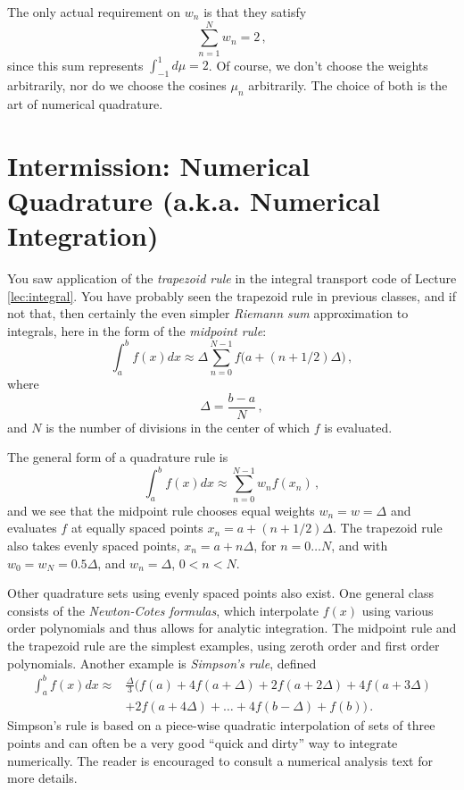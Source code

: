 The only actual requirement on $w_n$ is that they satisfy
\begin{equation}
 \sum^N_{n=1} w_n = 2 \, ,
\end{equation}
since this sum represents $\int^1_{-1} d\mu = 2$.  Of course, we don't choose the weights arbitrarily, nor do we choose the cosines $\mu_n$ arbitrarily.  The choice of both is the art of numerical quadrature.

\section*{Intermission: Numerical Quadrature (a.k.a. Numerical Integration)}

You saw application of the \textit{trapezoid rule} in the integral transport code of Lecture \ref{lec:integral}.  You have probably seen the trapezoid rule in previous classes, and if not that, then certainly the even simpler \textit{Riemann sum} approximation to integrals, here in the form of the \textit{midpoint rule}:
\begin{equation}
 \int^b_a f(x)dx \approx  \Delta \sum^{N-1}_{n=0} f \Big ( a + (n+1/2)\Delta \Big ) \, ,
\end{equation}
where
\begin{equation}
 \Delta = \frac{b-a}{N} \, ,
\end{equation}
and $N$ is the number of divisions in the center of which $f$ is evaluated.

The general form of a quadrature rule is
\begin{equation}
 \int^b_a f(x) dx \approx  \sum^{N-1}_{n=0} w_n f(x_n) \, , 
\end{equation}
and we see that the midpoint rule chooses equal weights $w_n = w = \Delta$ and evaluates $f$ at equally spaced points $x_n = a+(n+1/2)\Delta$.  The trapezoid rule also takes evenly spaced points, $x_n = a + n\Delta$, for $n = 0 \ldots N$, and with $w_0 = w_N = 0.5\Delta$, and $w_n = \Delta$, $0 < n < N$.

Other quadrature sets using evenly spaced points also exist.  One general class consists of the \textit{Newton-Cotes formulas}, which interpolate $f(x)$ using various order polynomials and thus allows for analytic integration.  The midpoint rule and the trapezoid rule are the simplest examples, using zeroth order and first order polynomials. Another example is \textit{Simpson's rule}, defined
\begin{equation}
\begin{split}
 \int^b_a f(x) dx \approx & \frac{\Delta}{3} \Big ( f(a)+4f(a+\Delta) +2f(a+2\Delta)+4f(a+3\Delta) \\
                          &  +2f(a+4\Delta)+\ldots+ 4f(b-\Delta) + f(b) \Big ) \, .
\end{split}
\end{equation}
Simpson's rule is based on a piece-wise quadratic interpolation of sets of three points and can often be a very good ``quick and dirty'' way to integrate numerically. The reader is encouraged to consult a numerical analysis text for more details.

